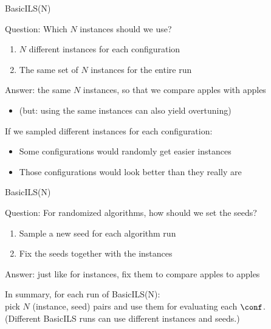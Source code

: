 \begin{frame}[c,fragile]{BasicILS(N)}


Question: \alert{Which} $N$ instances should we use? \hands
\begin{enumerate}
	\item $N$ different instances for each configuration
	\item The same set of $N$ instances for the entire run
\end{enumerate}

\bigskip
\pause
  Answer: the same $N$ instances, so that we compare apples with apples
  \begin{itemize}
	\item[] (but: using the same instances can also yield overtuning) 
  \end{itemize}
\bigskip
  
  
 If we sampled different instances for each configuration:
  \begin{itemize}
	\item Some configurations would randomly get easier instances
	\item Those configurations would look better than they really are
  \end{itemize}


\end{frame}



\begin{frame}[c,fragile]{BasicILS(N)}

Question: For randomized algorithms, how should we set the seeds? \hands
\begin{enumerate}
	\item Sample a new seed for each algorithm run
	\item Fix the seeds together with the instances
\end{enumerate}
\bigskip
\pause
Answer: just like for instances, fix them to compare apples to apples

\bigskip
\pause
In summary, for each run of BasicILS(N): \\pick $N$ (instance, seed) pairs and use them for evaluating each $\conf$.\\
\pause
(Different BasicILS runs can use different instances and seeds.)

\end{frame}


